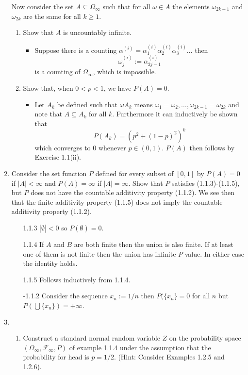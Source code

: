\documentclass{article}
\newcommand{\F}{\mathcal{F}}
\begin{document}
\begin{enumerate}
	Now consider the set $A \subseteq \Omega_\infty$ such that for all $\omega \in A$ the elements $\omega_{2k - 1}$ and $\omega_{2k}$ are the same for all $k \geq 1$.
		\begin{enumerate}
			\item Show that $A$ is uncountably infinite.
				\begin{itemize}
					\item Suppose there is a counting $\alpha^{(i)} = \alpha_1^{(i)}\alpha_2^{(i)}\alpha_3^{(i)}\dots$ then
					$$
					\omega_j^{(i)} := \alpha_{2j - 1}^{(i)}
					$$
					is a counting of $\Omega_\infty$, which is impossible.
				\end{itemize}
			\item Show that, when $0 < p < 1$, we have $P(A) = 0$.
				\begin{itemize}
					\item Let $A_{k}$ be defined such that $\omega A_k$ means $\omega_1 = \omega_2, \dots, \omega_{2k - 1} = \omega_{2k}$ and note that $A \subseteq A_k$ for all $k$. Furthermore it can inductively be shown that
					$$
					P(A_k) = (p^2 + (1 - p)^2)^k
					$$
					which converges to $0$ whenever $p \in (0, 1)$. $P(A)$ then follows by Exercise 1.1(ii).
				\end{itemize}
		\end{enumerate}
	\item Consider the set function $P$ defined for every subset of $[0, 1]$ by $P(A) = 0$ if $|A| < \infty$ and $P(A) = \infty$ if $|A| = \infty$. Show that $P$ satisfies (1.1.3)-(1.1.5), but $P$ does not have the countable additivity property (1.1.2). We see then that the finite additivity property (1.1.5) does not imply the countable additivity property (1.1.2).
		\begin{itemize}
			\item[1.1.3] $|\emptyset| < 0$ so $P(\emptyset) = 0$. 
			\item[1.1.4] If $A$ and $B$ are both finite then the union is also finite. If at least one of them is not finite then the union has infinite $P$ value. In either case the identity holds. 
			\item[1.1.5] Follows inductively from 1.1.4.
			\item[-1.1.2] Consider the sequence $x_n := 1 / n$ then $P(\{x_n\} = 0$ for all $n$ but $P\left(\bigcup \{x_n\}\right) = +\infty$.
		\end{itemize}
	\item
		\begin{enumerate}
			\item Construct a standard normal random variable $Z$ on the probability space $(\Omega_\infty, \F_\infty, P)$ of example 1.1.4 under the assumption that the probability for head is $p = 1 / 2$. (Hint: Consider Examples 1.2.5 and 1.2.6).

\end{enumerate}
\end{enumerate}
\end{document}
